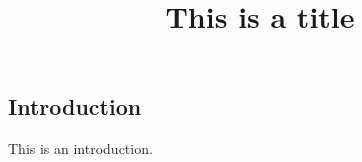 \documentclass[10pt,journal,cspaper,compsoc]{IEEEtran}
\begin{document}
\begin{CJK}{UTF8}{min}
\title{This is a title}

\maketitle

\section{Introduction}
This is an introduction.

\end{CJK}
\end{document}
